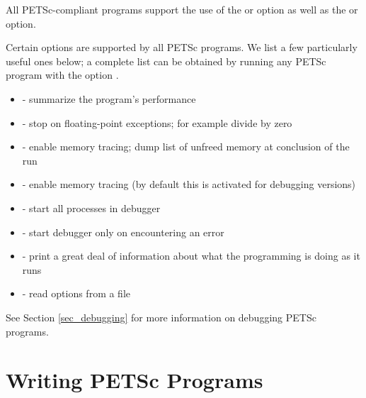 All PETSc-compliant programs support the use of the 
 or  option as well as the  
or  option.


Certain options are supported by all PETSc programs.  We list a few
particularly useful ones below; a complete list can be obtained by
running any PETSc program with the option .
\begin{itemize}
\item {} - summarize the program's performance
\item {} - stop on floating-point exceptions; 
      for example divide by zero
\item {} - enable memory tracing; dump list of unfreed memory
      at conclusion  of the run
\item {} - enable memory tracing (by default this is
      activated for debugging versions)
\item {}  
     - start all processes in debugger  
\item {}  
       - start debugger only on encountering an error
\item {} - print a great deal of information about what the programming is doing as it runs
\item {}  - read options from a file
\end{itemize}
See Section \ref{sec_debugging} for more information on debugging PETSc programs.

\section{Writing PETSc Programs}
\label{sec_writing}

